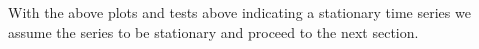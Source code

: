 

\noindent
With the above plots and tests above indicating a stationary time series we assume the series to be stationary and proceed to the next section.





